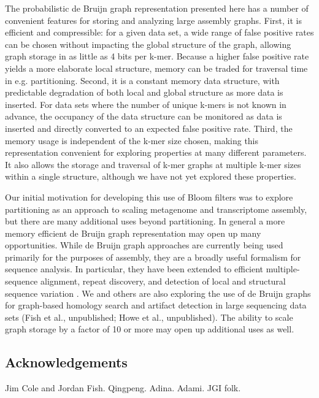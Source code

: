 \documentclass[12pt]{article} \usepackage{simplemargins}
\begin{document}
The probabilistic de Bruijn graph representation presented here has a
number of convenient features for storing and analyzing large assembly
graphs.  First, it is efficient and compressible: for a given data
set, a wide range of false positive rates can be chosen without
impacting the global structure of the graph, allowing graph storage in
as little as 4 bits per k-mer.  Because a higher false positive rate
yields a more elaborate local structure, memory can be traded for
traversal time in e.g. partitioning.  Second, it is a constant memory
data structure, with predictable degradation of both local and global
structure as more data is inserted.  For data sets where the number of
unique k-mers is not known in advance, the occupancy of the data
structure can be monitored as data is inserted and directly converted
to an expected false positive rate.  Third, the memory usage is
independent of the k-mer size chosen, making this representation
convenient for exploring properties at many different parameters.  It
also allows the storage and traversal of k-mer graphs at multiple
k-mer sizes within a single structure, although we have not yet
explored these properties.

Our initial motivation for developing this use of Bloom filters was to
explore partitioning as an approach to scaling metagenome and
transcriptome assembly, but there are many additional uses beyond
partitioning. In general a more memory efficient de Bruijn graph
representation may open up many opportunities.  While de Bruijn graph
approaches are currently being used primarily for the purposes of
assembly, they are a broadly useful formalism for sequence
analysis. In particular, they have been extended to efficient
multiple-sequence alignment\cite{zhang2003dna}, repeat
discovery\cite{price2005novo}, and detection of local and structural
sequence variation \cite{zerbinothesis}.  We and others are also
exploring the use of de Bruijn graphs for graph-based homology search
and artifact detection in large sequencing data sets (Fish et al.,
unpublished; Howe et al., unpublished).  The ability to scale graph
storage by a factor of 10 or more may open up additional uses as well.


\subsection{Acknowledgements}

Jim Cole and Jordan Fish.  Qingpeng.  Adina.  Adami.  JGI folk.



\end{document}
